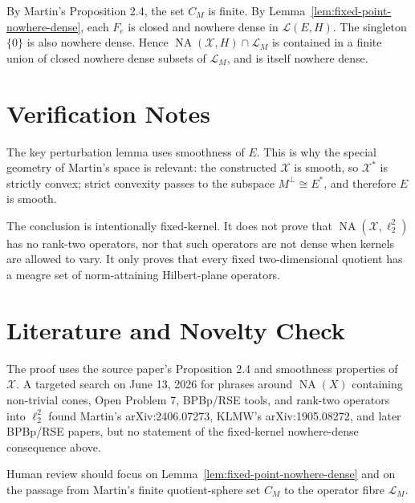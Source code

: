 \documentclass[11pt]{article}
\newcommand{\X}{\mathcal X}
\newcommand{\NA}{\operatorname{NA}}
\newcommand{\calL}{\mathcal L}
\begin{document}
By Martin's Proposition 2.4, the set \(C_M\) is finite. By
Lemma~\ref{lem:fixed-point-nowhere-dense}, each \(F_e\) is closed and nowhere
dense in \(\calL(E,H)\). The singleton \(\{0\}\) is also nowhere dense.
Hence \(\NA(\X,H)\cap \calL_M\) is contained in a finite union of closed
nowhere dense subsets of \(\calL_M\), and is itself nowhere dense.

\section*{Verification Notes}

The key perturbation lemma uses smoothness of \(E\). This is why the special
geometry of Martin's space is relevant: the constructed \(\X\) is smooth, so
\(\X^*\) is strictly convex; strict convexity passes to the subspace
\(M^\perp\cong E^*\), and therefore \(E\) is smooth.

The conclusion is intentionally fixed-kernel. It does not prove that
\(\NA(\X,\ell_2^2)\) has no rank-two operators, nor that such operators are
not dense when kernels are allowed to vary. It only proves that every fixed
two-dimensional quotient has a meagre set of norm-attaining Hilbert-plane
operators.

\section*{Literature and Novelty Check}

The proof uses the source paper's Proposition 2.4 and smoothness properties
of \(\X\). A targeted search on June 13, 2026 for phrases around
\(\NA(X)\) containing non-trivial cones, Open Problem 7, BPBp/RSE tools, and
rank-two operators into \(\ell_2^2\) found Martin's arXiv:2406.07273, KLMW's
arXiv:1905.08272, and later BPBp/RSE papers, but no statement of the
fixed-kernel nowhere-dense consequence above.

Human review should focus on Lemma~\ref{lem:fixed-point-nowhere-dense} and
on the passage from Martin's finite quotient-sphere set \(C_M\) to the
operator fibre \(\calL_M\).
\end{document}
